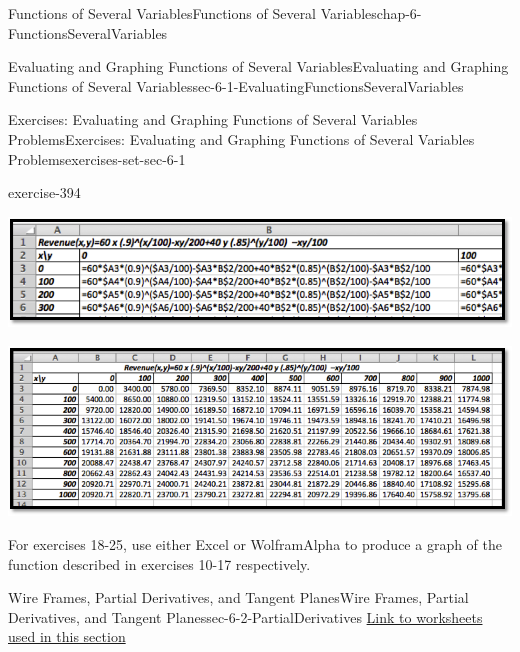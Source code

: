 \documentclass[oneside,10pt,]{book}
\numberwithin{equation}{section}
\begin{document}
\begin{chapterptx}{Functions of Several Variables}{}{Functions of Several Variables}{}{}{chap-6-FunctionsSeveralVariables}
\begin{sectionptx}{Evaluating and Graphing Functions of Several Variables}{}{Evaluating and Graphing Functions of Several Variables}{}{}{sec-6-1-EvaluatingFunctionsSeveralVariables}
\begin{exercises-subsection-numberless}{Exercises: Evaluating and Graphing Functions of Several Variables Problems}{}{Exercises: Evaluating and Graphing Functions of Several Variables Problems}{}{}{exercises-set-sec-6-1}
\begin{exercisegroup}
\begin{divisionexerciseeg}{17}{}{}{exercise-394}
\begin{sidebyside}{1}{0}{0}{0}
\begin{sbspanel}{1}
\includegraphics[width=1\linewidth]{images/sec6-1-sol17a.png}
\end{sbspanel}%
\end{sidebyside}%
\begin{sidebyside}{1}{0.05}{0.05}{0}%
\begin{sbspanel}{0.9}%
\includegraphics[width=1\linewidth]{images/sec6-1-sol17b.png}
\end{sbspanel}%
\end{sidebyside}%
\end{divisionexerciseeg}%
\end{exercisegroup}
\par\medskip\noindent
\par\medskip\noindent%
\hypertarget{exercisegroup-26}{}%
\hypertarget{p-2202}{}%
For exercises 18-25, use either Excel or WolframAlpha to produce a graph of the function described in exercises 10-17 respectively.%
\begin{exercisegroup}
\end{exercisegroup}
\par\medskip\noindent
\end{exercises-subsection-numberless}
\end{sectionptx}
%
%
\typeout{************************************************}
\typeout{************************************************}
%
\begin{sectionptx}{Wire Frames, Partial Derivatives, and Tangent Planes}{}{Wire Frames, Partial Derivatives, and Tangent Planes}{}{}{sec-6-2-PartialDerivatives}
\hypertarget{p-2203}{}%
\href{./Examples/Section-6-2-Examples.xlsx}{Link to worksheets used in this section}%
\par

\end{sectionptx}
\end{chapterptx}
\end{document}
